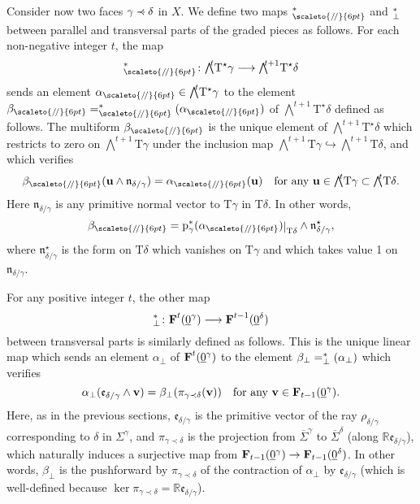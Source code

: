 \documentclass[11pt]{amsart}
\theoremstyle{definition}
\numberwithin{equation}{section}
\renewcommand{\~}{\widetilde}
\newcommand{\R}{\mathbb{R}}
\newcommand{\rest}[1]{\raisebox{-1pt}{$\vert$}_{#1}}
\let\oldbigwedge\bigwedge
\renewcommand{\bigwedge}{{\textstyle\oldbigwedge\!}}
\renewcommand{\u}{\mathbf u} %
\renewcommand{\v}{\mathbf v} %
\newcommand{\e}{{\mathfrak e}} %
\newcommand{\TT}{\mathrm{T}} %
\newcommand{\dual}{\star} %
\let\i\relax
\newcommand{\i}{{\mathop{}\mathrm{i}}} %
\newcommand{\parr}{{\scaleto{/\!/}{6pt}}} %
\newcommand{\SF}{\textrm{\bf F}} %
\newcommand{\nvect}{\mathfrak n} %
\newcommand{\p}{{\rm p}} %
\newcommand{\comp}[1]{\overline{#1}} %
\newcommand{\conezero}{{\underline0}} %
\newcommand{\subface}{\prec}
\newcommand{\ssubface}{\mathbin{\mathchoice
  {\subface\!\!\!\cdot}%
  {\subface\!\!\!\cdot}%
  {\subface\!\cdot}%
  {\subface\!\cdot}%
}} %
\begin{document}
\medskip

Consider now two faces $\gamma\ssubface\delta$ in $X$. We define two maps $\i^*_\parr$ and $\i^*_\perp$ between parallel and transversal parts of the graded pieces as follows. For each non-negative integer $t$, the map
\[\i^*_\parr \colon \bigwedge^{t} \TT^\dual\gamma \longrightarrow   \bigwedge^{t+1} \TT^\dual\delta \]
sends an element $\alpha_\parr \in  \bigwedge^{t} \TT^\dual\gamma$ to the element $\beta_\parr =  \i^*_\parr(\alpha_\parr)$ of $\bigwedge^{t+1} \TT^\dual\delta$ defined as follows. The multiform $\beta_\parr$ is the unique element of $\bigwedge^{t+1} \TT^\dual\delta$ which restricts to zero on $\bigwedge^{t+1}\TT\gamma$ under the inclusion map $\bigwedge^{t+1} \TT \gamma \hookrightarrow \bigwedge^{t+1} \TT\delta$, and which verifies
\[ \beta_\parr(\u\wedge \nvect_{\delta/\gamma})=\alpha_\parr(\u) \quad\text{for any $\u\in\bigwedge^{t}\TT\gamma\subset\bigwedge^{t}\TT\delta$}. \]
Here $\nvect_{\delta/\gamma}$ is any primitive normal vector to $\TT\gamma$ in $\TT\delta$. In other words,
\[ \beta_\parr=\p_\gamma^*(\alpha_\parr)\rest{\TT\delta} \wedge \nvect_{\delta/\gamma}^\dual, \]
where $\nvect_{\delta/\gamma}^\dual$ is the form on $\TT\delta$ which vanishes on $\TT\gamma$ and which takes value 1 on $\nvect_{\delta/\gamma}$.

For any positive integer $t$, the other map
\[\i^*_\perp\colon \SF^{t}(\conezero^\gamma) \longrightarrow \SF^{t-1}(\conezero^\delta)\]
between transversal parts is similarly defined as follows. This is the unique linear map which sends an element $\alpha_\perp$ of $\SF^{t}(\conezero^\gamma)$ to the element $\beta_\perp = \i^*_\perp(\alpha_\perp)$ which verifies
\[ \alpha_\perp(\e_{\delta/\gamma}\wedge\v)=\beta_\perp(\pi_{\gamma\subface\delta}(\v)) \quad\text{for any $\v\in \SF_{t-1}(\conezero^\gamma)$}. \]
Here, as in the previous sections, $\e_{\delta/\gamma}$ is the primitive vector of the ray $\rho_{\delta/\gamma}$ corresponding to $\delta$ in $\Sigma^\gamma$, and $\pi_{\gamma\subface\delta}$ is the projection from $\comp\Sigma^\gamma$ to $\comp\Sigma^\delta$ (along $\R \e_{\delta/\gamma}$), which naturally induces a surjective map from $\SF_{t-1}(\conezero^\gamma)\to \SF_{t-1}(\conezero^\delta)$. In other words, $\beta_\perp$ is the pushforward by $\pi_{\gamma\subface\delta}$ of the contraction of $\alpha_\perp$ by $\e_{\delta/\gamma}$ (which is well-defined because $\ker{\pi_{\gamma\subface\delta}}=\R \e_{\delta/\gamma}$).
\end{document}
